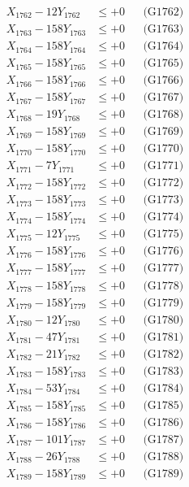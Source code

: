\documentclass[a4paper,10pt]{article}
\begin{document}
{\begin{align}
X_{1762} - 12Y_{1762} &\leq +0 && \text{(G1762)} \\
X_{1763} - 158Y_{1763} &\leq +0 && \text{(G1763)} \\
X_{1764} - 158Y_{1764} &\leq +0 && \text{(G1764)} \\
X_{1765} - 158Y_{1765} &\leq +0 && \text{(G1765)} \\
X_{1766} - 158Y_{1766} &\leq +0 && \text{(G1766)} \\
X_{1767} - 158Y_{1767} &\leq +0 && \text{(G1767)} \\
X_{1768} - 19Y_{1768} &\leq +0 && \text{(G1768)} \\
X_{1769} - 158Y_{1769} &\leq +0 && \text{(G1769)} \\
X_{1770} - 158Y_{1770} &\leq +0 && \text{(G1770)} \\
\allowbreak
X_{1771} - 7Y_{1771} &\leq +0 && \text{(G1771)} \\
X_{1772} - 158Y_{1772} &\leq +0 && \text{(G1772)} \\
X_{1773} - 158Y_{1773} &\leq +0 && \text{(G1773)} \\
X_{1774} - 158Y_{1774} &\leq +0 && \text{(G1774)} \\
X_{1775} - 12Y_{1775} &\leq +0 && \text{(G1775)} \\
X_{1776} - 158Y_{1776} &\leq +0 && \text{(G1776)} \\
X_{1777} - 158Y_{1777} &\leq +0 && \text{(G1777)} \\
X_{1778} - 158Y_{1778} &\leq +0 && \text{(G1778)} \\
X_{1779} - 158Y_{1779} &\leq +0 && \text{(G1779)} \\
X_{1780} - 12Y_{1780} &\leq +0 && \text{(G1780)} \\
\allowbreak
X_{1781} - 47Y_{1781} &\leq +0 && \text{(G1781)} \\
X_{1782} - 21Y_{1782} &\leq +0 && \text{(G1782)} \\
X_{1783} - 158Y_{1783} &\leq +0 && \text{(G1783)} \\
X_{1784} - 53Y_{1784} &\leq +0 && \text{(G1784)} \\
X_{1785} - 158Y_{1785} &\leq +0 && \text{(G1785)} \\
X_{1786} - 158Y_{1786} &\leq +0 && \text{(G1786)} \\
X_{1787} - 101Y_{1787} &\leq +0 && \text{(G1787)} \\
X_{1788} - 26Y_{1788} &\leq +0 && \text{(G1788)} \\
X_{1789} - 158Y_{1789} &\leq +0 && \text{(G1789)} \\

\end{align}}
\end{document}
